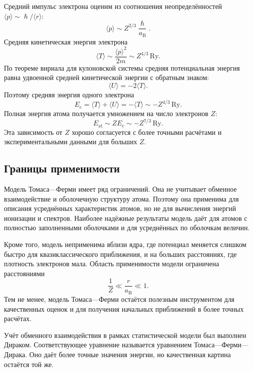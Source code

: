 \documentclass[a4paper, 12pt]{article}
\numberwithin{equation}{section}
\begin{document}
Средний импульс электрона оценим из соотношения неопределённостей $\langle p \rangle \sim \hslash / \langle r \rangle$:
\begin{equation}
\label{eq:tf_momentum}
\langle p \rangle \sim Z^{2/3} \frac{\hslash}{a_{\text{B}}}.
\end{equation}
Средняя кинетическая энергия электрона
\begin{equation}
\label{eq:tf_kinetic_energy}
\langle T \rangle \sim \frac{\langle p \rangle^2}{2m} \sim Z^{4/3} \, \text{Ry}.
\end{equation}
По теореме вириала для кулоновской системы средняя потенциальная энергия равна удвоенной средней кинетической энергии с обратным знаком:
\begin{equation}
\langle U \rangle = -2 \langle T \rangle.
\end{equation}
Поэтому средняя энергия одного электрона
\begin{equation}
\label{eq:tf_electron_energy}
E_e = \langle T \rangle + \langle U \rangle = -\langle T \rangle \sim -Z^{4/3} \, \text{Ry}.
\end{equation}
Полная энергия атома получается умножением на число электронов $Z$:
\begin{equation}
\label{eq:tf_atom_energy}
E_{\text{at}} \sim Z E_e \sim -Z^{7/3} \, \text{Ry}.
\end{equation}
Эта зависимость от $Z$ хорошо согласуется с более точными расчётами и экспериментальными данными для больших $Z$.

\subsection{Границы применимости}
\label{subsec:tf_limitations}

Модель Томаса---Ферми имеет ряд ограничений. Она не учитывает обменное взаимодействие и оболочечную структуру атома. Поэтому она применима для описания усреднённых характеристик атомов, но не для вычисления энергий ионизации и спектров. Наиболее надёжные результаты модель даёт для атомов с полностью заполненными оболочками и для усреднённых по оболочкам величин.

Кроме того, модель неприменима вблизи ядра, где потенциал меняется слишком быстро для квазиклассического приближения, и на больших расстояниях, где плотность электронов мала. Область применимости модели ограничена расстояниями
\begin{equation}
\frac{1}{Z} \ll \frac{r}{a_{\text{B}}} \ll 1.
\end{equation}
Тем не менее, модель Томаса---Ферми остаётся полезным инструментом для качественных оценок и для получения начальных приближений в более точных расчётах.

Учёт обменного взаимодействия в рамках статистической модели был выполнен Дираком. Соответствующее уравнение называется уравнением Томаса---Ферми---Дирака. Оно даёт более точные значения энергии, но качественная картина остаётся той же.
\end{document}
